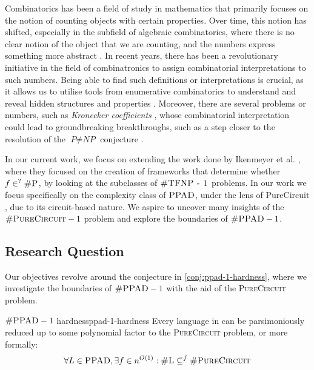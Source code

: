 Combinatorics has been a field of study in mathematics that primarily focuses on
the notion of counting objects with certain properties. Over time, this notion
has shifted, especially in the subfield of algebraic combinatorics, where
there is no clear notion of the object that we are counting,
and the numbers express something more abstract \cite{pak_WhatCombinatorialInterpretation_2022}.
In recent years, there has been a revolutionary
initiative in the field of combinatronics to assign combinatorial interpretations to such numbers.
Being able to find such definitions or interpretations is crucial,
as it allows us to utilise tools from enumerative combinatorics to understand
and reveal hidden structures and properties \cite{pak_WhatCombinatorialInterpretation_2022}. 
Moreover, there are several problems or numbers, such as \textit{Kronecker coefficients} \cite{makar_AnalysisKroneckerProduct_1949},
whose combinatorial interpretation could lead to groundbreaking breakthroughs, such as a step closer to the resolution of the $\textit{P} \neq \textit{NP}$
conjecture \cite{ikenmeyer_WhatWhatNot_2022, ikenmeyer_VanishingKroneckerCoefficients_2017}.


In our current work, we focus on extending the work done by
Ikenmeyer et al. \cite{ikenmeyer_WhatWhatNot_2022}, where they focused on the creation of frameworks
that determine whether$f \in^? \textsc{\#P}$, by looking
at the subclasses of $\textsc{\#TFNP - 1}$ problems.
In our work we focus specifically on the complexity class of $\textsc{PPAD}$, under the lens of $\text{PureCircuit}$,
due to its circuit-based nature.
We aspire to uncover many insights of the $\textsc{\#PureCircuit} -1$ problem 
and explore the boundaries of $\textsc{\#PPAD} -1$.


\subsection{Research Question}

Our objectives revolve around the conjecture in \ref{conj:ppad-1-hardness}, where
we investigate the boundaries of $\textnormal{\textsc{\#PPAD}}-1$ with the aid of the \textsc{PureCircuit} problem.
\begin{conjecturebox}{$\textnormal{\textsc{\#PPAD}}-1$ hardness}{ppad-1-hardness}
    Every language in  can be parsimoniously reduced up to some polynomial factor to the
    \textsc{PureCircuit} problem, or more formally:
    $$
    \forall L \in \textnormal{\textsc{PPAD}}, \exists f \in n^{O(1)}: 
    \textnormal{\textsc{\#L}} \subseteq^f \textnormal{\textsc{\#PureCircuit}}
    $$
\end{conjecturebox}




